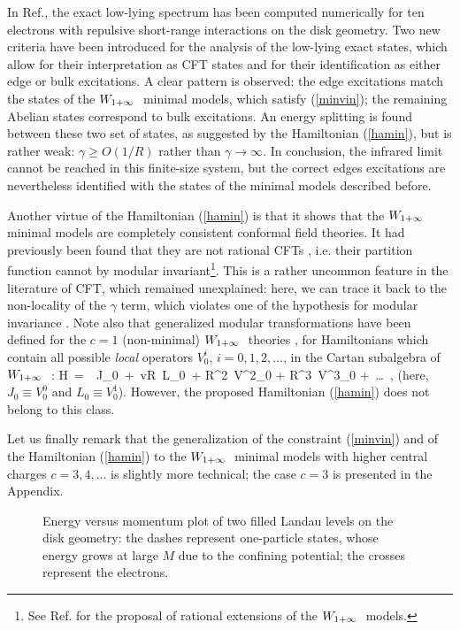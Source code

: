 In Ref.\cite{cmsz}, the exact low-lying spectrum has been
computed numerically for ten electrons with repulsive short-range
interactions on the disk geometry.
Two new criteria have been introduced for the 
analysis of the low-lying exact states, which allow for their interpretation
as CFT states and for their identification as either edge or bulk excitations.
A clear pattern is observed:
the edge excitations match the states of the $W_{1+\infty}\ $ minimal models,
which satisfy (\ref{minvin}); the remaining Abelian states correspond to
bulk excitations.
An energy splitting is found between these two set of states, as suggested by
the Hamiltonian (\ref{hamin}), but is rather weak:
$\gamma \ge O(1/R)$ rather than $\gamma\to\infty$.
In conclusion, the infrared limit cannot be reached in this finite-size
system, but the correct edges excitations are nevertheless
identified with the states of the minimal models described before.

Another virtue of the Hamiltonian (\ref{hamin}) is that it
shows that the $W_{1+\infty}\ $ minimal models are completely
consistent conformal field theories. 
It had previously been found \cite{cz} that they are not rational CFTs
\cite{cft}, i.e. their partition function cannot by modular invariant\footnote{
See Ref.\cite{kactod} for the proposal of rational extensions
of the $W_{1+\infty}\ $ models.}.
This is a rather uncommon feature in the literature of CFT, which
remained unexplained: here, we can trace it back to the non-locality
of the $\gamma$ term, which violates one of the hypothesis
for modular invariance \cite{cft}. 
Note also that generalized modular transformations have been 
defined for the $c=1$ (non-minimal) $W_{1+\infty}\ $ theories \cite{dijk},
for Hamiltonians which contain all possible {\it local} operators $V^i_0$,
$ i=0,1,2,\dots$, in the Cartan subalgebra of $W_{1+\infty}\ $ \cite{ctz4}:
\beq
H\ =\ \alpha\ J_0\ +\ {v\over R}\ L_0\ + {\beta\over R^2}\ V^2_0 + 
{\delta\over R^3}\ V^3_0 +\ \dots \ ,
\eeq
(here, $J_0\equiv V_0^0$ and $L_0\equiv V^1_0$).
However, the proposed Hamiltonian (\ref{hamin}) does not belong to this
class.

Let us finally remark that the generalization of the constraint
(\ref{minvin}) and of the Hamiltonian (\ref{hamin}) to the 
$W_{1+\infty}\ $ minimal models with higher central charges $c=3,4,\dots$
is slightly more technical; the case $c=3$ is presented in the Appendix.



\begin{figure}
\epsfxsize=12cm  
\caption{Energy versus momentum plot of 
two filled Landau levels on the disk geometry:
the dashes represent one-particle states, whose energy grows
at large $M$ due to the confining potential;
the crosses represent the electrons.}
\label{fig2}
\end{figure}


